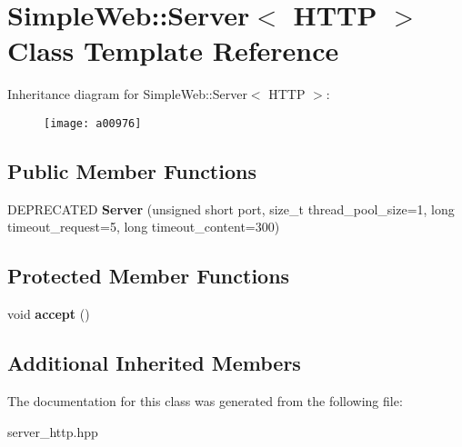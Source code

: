 \hypertarget{a00976}{}\section{Simple\+Web\+:\+:Server$<$ H\+T\+TP $>$ Class Template Reference}
\label{a00976}
Inheritance diagram for Simple\+Web\+:\+:Server$<$ H\+T\+TP $>$\+:\begin{figure}[H]
\begin{center}
\leavevmode
\texttt{[image: a00976]}
\end{center}
\end{figure}
\subsection*{Public Member Functions}
\begin{DoxyCompactItemize}
\item 
\mbox{\label{a00976_a926e5ebedafc2d17a944698197b7f002}} 
D\+E\+P\+R\+E\+C\+A\+T\+ED {\bfseries Server} (unsigned short port, size\+\_\+t thread\+\_\+pool\+\_\+size=1, long timeout\+\_\+request=5, long timeout\+\_\+content=300)
\end{DoxyCompactItemize}
\subsection*{Protected Member Functions}
\begin{DoxyCompactItemize}
\item 
\mbox{\label{a00976_abe9f9de361dcb01541e0302eac21986d}} 
void {\bfseries accept} ()
\end{DoxyCompactItemize}
\subsection*{Additional Inherited Members}


The documentation for this class was generated from the following file\+:\begin{DoxyCompactItemize}
\item 
server\+\_\+http.\+hpp\end{DoxyCompactItemize}
